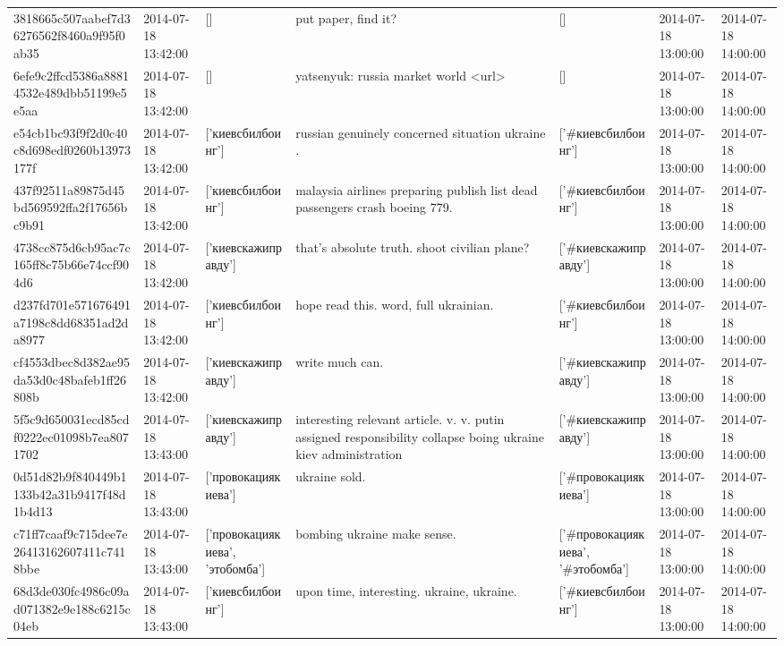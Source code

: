 \begin{tabular}{lllllll}
3818665c507aabef7d36276562f8460a9f95f0ab35 & 2014-07-18 13:42:00 & [] & put paper, find it? & [] & 2014-07-18 13:00:00 & 2014-07-18 14:00:00 \\
6efe9c2ffcd5386a88814532e489dbb51199e5e5aa & 2014-07-18 13:42:00 & [] & yatsenyuk: russia market world <url> & [] & 2014-07-18 13:00:00 & 2014-07-18 14:00:00 \\
e54cb1bc93f9f2d0c40c8d698edf0260b13973177f & 2014-07-18 13:42:00 & ['киевсбилбоинг'] & russian genuinely concerned situation ukraine . & ['#киевсбилбоинг'] & 2014-07-18 13:00:00 & 2014-07-18 14:00:00 \\
437f92511a89875d45bd569592ffa2f17656bc9b91 & 2014-07-18 13:42:00 & ['киевсбилбоинг'] & malaysia airlines preparing publish list dead passengers crash boeing 779. & ['#киевсбилбоинг'] & 2014-07-18 13:00:00 & 2014-07-18 14:00:00 \\
4738cc875d6cb95ac7c165ff8c75b66e74ccf904d6 & 2014-07-18 13:42:00 & ['киевскажиправду'] & that's absolute truth. shoot civilian plane? & ['#киевскажиправду'] & 2014-07-18 13:00:00 & 2014-07-18 14:00:00 \\
d237fd701e571676491a7198c8dd68351ad2da8977 & 2014-07-18 13:42:00 & ['киевсбилбоинг'] & hope read this. word, full ukrainian. & ['#киевсбилбоинг'] & 2014-07-18 13:00:00 & 2014-07-18 14:00:00 \\
cf4553dbec8d382ae95da53d0c48bafeb1ff26808b & 2014-07-18 13:42:00 & ['киевскажиправду'] & write much can. & ['#киевскажиправду'] & 2014-07-18 13:00:00 & 2014-07-18 14:00:00 \\
5f5c9d650031ecd85cdf0222ec01098b7ea8071702 & 2014-07-18 13:43:00 & ['киевскажиправду'] & interesting relevant article. v. v. putin assigned responsibility collapse boing ukraine kiev administration & ['#киевскажиправду'] & 2014-07-18 13:00:00 & 2014-07-18 14:00:00 \\
0d51d82b9f840449b1133b42a31b9417f48d1b4d13 & 2014-07-18 13:43:00 & ['провокациякиева'] & ukraine sold. & ['#провокациякиева'] & 2014-07-18 13:00:00 & 2014-07-18 14:00:00 \\
c71ff7caaf9c715dee7e26413162607411c7418bbe & 2014-07-18 13:43:00 & ['провокациякиева', 'этобомба'] & bombing ukraine make sense. & ['#провокациякиева', '#этобомба'] & 2014-07-18 13:00:00 & 2014-07-18 14:00:00 \\
68d3de030fc4986c09ad071382e9e188c6215c04eb & 2014-07-18 13:43:00 & ['киевсбилбоинг'] & upon time, interesting. ukraine, ukraine. & ['#киевсбилбоинг'] & 2014-07-18 13:00:00 & 2014-07-18 14:00:00 \\

\end{tabular}
